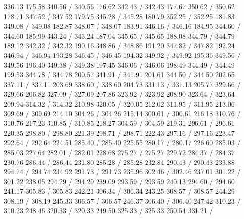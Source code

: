 { 336.13 175.58 340.56 /
 340.56 176.62 342.43 /
 342.43 177.67 350.62 /
 350.62 178.71 347.52 /
 347.52 179.75 345.28 /
 345.28 180.79 352.25 /
 352.25 181.83 349.08 /
 349.08 182.87 348.07 /
 348.07 183.91 346.16 /
 346.16 184.95 344.60 /
 344.60 185.99 343.24 /
 343.24 187.04 345.65 /
 345.65 188.08 344.79 /
 344.79 189.12 342.32 /
 342.32 190.16 348.86 /
 348.86 191.20 347.82 /
 347.82 192.24 346.94 /
 346.94 193.28 346.45 /
 346.45 194.32 349.92 /
 349.92 195.36 349.56 /
 349.56 196.40 349.38 /
 349.38 197.45 346.06 /
 346.06 198.49 344.49 /
 344.49 199.53 344.78 /
 344.78 200.57 341.91 /
 341.91 201.61 344.50 /
 344.50 202.65 337.11 /
 337.11 203.69 338.60 /
 338.60 204.73 331.13 /
 331.13 205.77 329.66 /
 329.66 206.82 327.09 /
 327.09 207.86 323.92 /
 323.92 208.90 323.64 /
 323.64 209.94 314.32 /
 314.32 210.98 320.05 /
 320.05 212.02 311.95 /
 311.95 213.06 309.69 /
 309.69 214.10 304.26 /
 304.26 215.14 300.61 /
 300.61 216.18 310.76 /
 310.76 217.23 310.85 /
 310.85 218.27 304.59 /
 304.59 219.31 296.61 /
 296.61 220.35 298.80 /
 298.80 221.39 298.71 /
 298.71 222.43 297.16 /
 297.16 223.47 292.64 /
 292.64 224.51 285.40 /
 285.40 225.55 280.17 /
 280.17 226.60 285.03 /
 285.03 227.64 282.01 /
 282.01 228.68 275.27 /
 275.27 229.72 284.37 /
 284.37 230.76 286.44 /
 286.44 231.80 285.28 /
 285.28 232.84 290.43 /
 290.43 233.88 294.74 /
 294.74 234.92 291.73 /
 291.73 235.96 302.46 /
 302.46 237.01 301.22 /
 301.22 238.05 294.29 /
 294.29 239.09 293.59 /
 293.59 240.13 294.60 /
 294.60 241.17 305.83 /
 305.83 242.21 306.34 /
 306.34 243.25 308.57 /
 308.57 244.29 308.19 /
 308.19 245.33 306.57 /
 306.57 246.37 306.40 /
 306.40 247.42 310.23 /
 310.23 248.46 320.33 /
 320.33 249.50 325.33 /
 325.33 250.54 331.21 /
}

